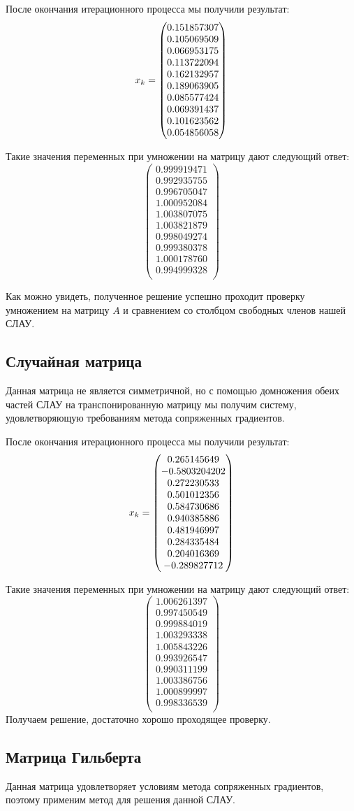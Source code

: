 \documentclass[../../report.tex]{subfiles}
\begin{document}
После окончания итерационного процесса мы получили результат:
\[
x_{k} = \begin{pmatrix} 0.151857307 \\ 0.105069509 \\ 0.066953175 \\ 0.113722094 \\ 0.162132957 \\ 0.189063905 \\ 0.085577424 \\ 0.069391437 \\ 0.101623562 \\ 0.054856058 \\ \end{pmatrix}
\]

Такие значения переменных при умножении на матрицу дают следующий ответ:
\[
\begin{pmatrix}
    0.999919471 \\
    0.992935755 \\
    0.996705047 \\
    1.000952084 \\
    1.003807075 \\
    1.003821879 \\
    0.998049274 \\
    0.999380378 \\
    1.000178760 \\
    0.994999328 \\
\end{pmatrix}
\]

Как можно увидеть, полученное решение успешно проходит проверку умножением на матрицу $A$
и сравнением со столбцом свободных членов нашей СЛАУ.

\subsection{Случайная матрица}
Данная матрица не является симметричной, но с помощью домножения обеих частей СЛАУ на транспонированную матрицу
мы получим систему, удовлетворяющую требованиям метода сопряженных градиентов.

После окончания итерационного процесса мы получили результат:
\[
x_{k} = \begin{pmatrix} 0.265145649 \\ -0.5803204202 \\ 0.272230533 \\ 0.501012356 \\ 0.584730686 \\ 0.940385886 \\ 0.481946997 \\ 0.284335484 \\ 0.204016369 \\ -0.289827712 \\ \end{pmatrix}
\]

Такие значения переменных при умножении на матрицу дают следующий ответ:
\[
\begin{pmatrix}
    1.006261397 \\
    0.997450549 \\
    0.999884019 \\
    1.003293338 \\
    1.005843226 \\
    0.993926547 \\
    0.990311199 \\
    1.003386756 \\
    1.000899997 \\
    0.998336539 \\
\end{pmatrix}
\]
Получаем решение, достаточно хорошо проходящее проверку.

\subsection{Матрица Гильберта}
Данная матрица удовлетворяет условиям метода сопряженных градиентов, поэтому применим
метод для решения данной СЛАУ.
\end{document}
